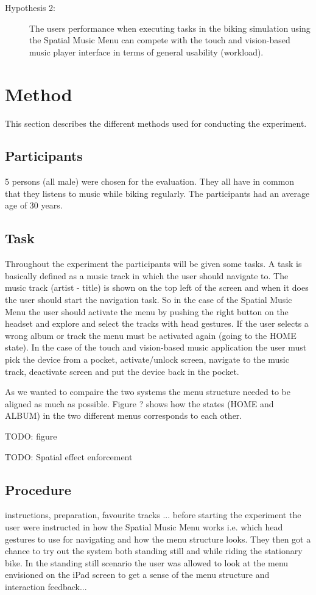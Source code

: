 \begin{description}
\item[Hypothesis 2:] The users performance when executing tasks in the biking simulation using the Spatial Music Menu can compete with the touch and vision-based music player interface in terms of general usability (workload).
\end{description}


\section{Method}
This section describes the different methods used for conducting the experiment.

\subsection{Participants}
5 persons (all male) were chosen for the evaluation. They all have in common that they listens to music while biking regularly. The participants had an average age of 30 years.

\subsection{Task}
Throughout the experiment the participants will be given some tasks. A task is basically defined as a music track in which the user should navigate to. The music track (artist - title) is shown on the top left of the screen and when it does the user should start the navigation task. So in the case of the Spatial Music Menu the user should activate the menu by pushing the right button on the headset and explore and select the tracks with head gestures. If the user selects a wrong album or track the menu must be activated again (going to the HOME state). In the case of the touch and vision-based music application the user must pick the device from a pocket, activate/unlock screen, navigate to the music track, deactivate screen and put the device back in the pocket.

As we wanted to compaire the two systems the menu structure needed to be aligned as much as possible. Figure ? shows how the states (HOME and ALBUM) in the two different menus corresponds to each other.

TODO: figure

TODO: Spatial effect enforcement

\subsection{Procedure}
instructions, preparation, favourite tracks
... before starting the experiment the user were instructed in how the Spatial Music Menu works i.e. which head gestures to use for navigating and how the menu structure looks. They then got a chance to try out the system both standing still and while riding the stationary bike. In the standing still scenario the user was allowed to look at the menu envisioned on the iPad screen to get a sense of the menu structure and interaction feedback...


